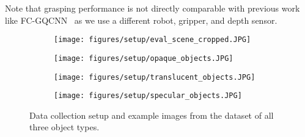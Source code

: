 Note that grasping performance is not directly comparable with previous work like FC-GQCNN~\cite{satish2019policy} as we use a different robot, gripper, and depth sensor.

\begin{figure*}[t]
    \vspace{2pt}
    \centering
    \begin{subfigure}[b]{0.1875\textwidth}
        \centering
        \texttt{[image: figures/setup/eval\_scene\_cropped.JPG]}
    \end{subfigure}
    \begin{subfigure}[b]{0.25\textwidth}
        \texttt{[image: figures/setup/opaque\_objects.JPG]}
    \end{subfigure}
    \begin{subfigure}[b]{0.25\textwidth}
        \texttt{[image: figures/setup/translucent\_objects.JPG]}
    \end{subfigure}
    \begin{subfigure}[b]{0.25\textwidth}
        \texttt{[image: figures/setup/specular\_objects.JPG]}
    \end{subfigure}
\caption{Data collection setup and example images from the dataset of all three object types.}
\label{fig:dataset}
\end{figure*}

